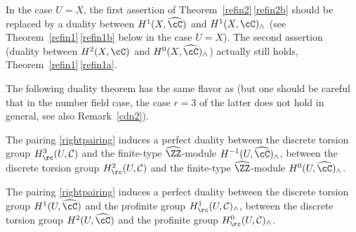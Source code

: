 \begin{rema}
In the case $U=X$, the first assertion of Theorem~\ref{refin2}\,\eqref{refin2b} should be replaced by a duality between
$H^1(X,\widehat \cC)$ and $H^1(X, \cC)_{\wedge}$ (see
Theorem~\ref{refin1}\,\eqref{refin1b} below in the case $U=X$). The second assertion
(duality
between $H^2(X,\cC)$ and $H^0(X, \widehat \cC)_{\wedge}$) actually still
holds, \cf Theorem~\ref{refin1}\,\eqref{refin1a}.
\end{rema}

The following duality theorem has the same flavor as \cite[Th~II.4.6\,(b)]{MilADT} (but one should be careful that in the number field case,
the case $r=3$ of the latter does not hold in general, see also
Remark~\ref{cdn2}).

\skpt
\begin{theo} \label{refin1}
\begin{enumeratea}
\item\label{refin1a}
The pairing \eqref{rightpairing}
induces a perfect duality between the discrete torsion group
$H^3_\rc(U,\mathcal C)$ and the finite-type $\widehat \ZZ$-module
$H^{-1}(U,\widehat \cC)_{\wedge}$, \resp between
the discrete torsion group
$H^2_\rc(U,\mathcal C)$ and the finite-type $\widehat \ZZ$-module
$H^0(U,\widehat \cC)_{\wedge}$.

\item\label{refin1b}
The pairing \eqref{rightpairing}
induces a perfect duality between the discrete torsion group
$H^1(U,\widehat \cC)$ and the profinite
group $H^1_\rc(U,\mathcal C)_{\wedge}$, \resp between
the discrete torsion group
$H^2(U,\widehat \cC)$ and the profinite
group $H^0_\rc(U,\mathcal C)_{\wedge}$.
\end{enumeratea}
\end{theo}

